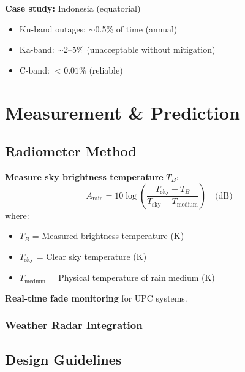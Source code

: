 \textbf{Case study:} Indonesia (equatorial)
\begin{itemize}
\item Ku-band outages: $\sim$0.5\% of time (annual)
\item Ka-band: $\sim$2--5\% (unacceptable without mitigation)
\item C-band: $< 0.01\%$ (reliable)
\end{itemize}

\section{Measurement \& Prediction}

\subsection{Radiometer Method}

\textbf{Measure sky brightness temperature} $T_B$:
\begin{equation}
A_{\text{rain}} = 10 \log\left(\frac{T_{\text{sky}} - T_B}{T_{\text{sky}} - T_{\text{medium}}}\right) \quad \text{(dB)}
\end{equation}
where:
\begin{itemize}
\item $T_B$ = Measured brightness temperature (K)
\item $T_{\text{sky}}$ = Clear sky temperature (K)
\item $T_{\text{medium}}$ = Physical temperature of rain medium (K)
\end{itemize}

\textbf{Real-time fade monitoring} for UPC systems.

\subsubsection{Weather Radar Integration}

\subsection{Design Guidelines}

